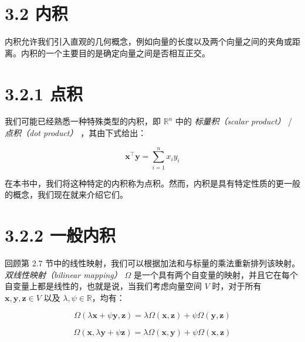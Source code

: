 \section*{3.2 内积}
\label{sec:3.2}

内积允许我们引入直观的几何概念，例如向量的长度以及两个向量之间的夹角或距离。内积的一个主要目的是确定向量之间是否相互正交。

\section*{3.2.1 点积}

我们可能已经熟悉一种特殊类型的内积，即 $ \mathbb{R}^n $ 中的 \emph{标量积（scalar product）} / \emph{点积（dot product）} ，其由下式给出：

\begin{equation}
\boldsymbol{x}^\top \boldsymbol{y} = \sum_{i=1}^n x_i y_i
\tag{3.5}\label{eq:3-5}
\end{equation}

在本书中，我们将这种特定的内积称为点积。然而，内积是具有特定性质的更一般的概念，我们现在就来介绍它们。

\section*{3.2.2 一般内积}

回顾第 2.7 节中的线性映射，我们可以根据加法和与标量的乘法重新排列该映射。 \emph{双线性映射（bilinear mapping）} $ \Omega $ 是一个具有两个自变量的映射，并且它在每个自变量上都是线性的，也就是说，当我们考虑向量空间 $ V $ 时，对于所有 $ \boldsymbol{x}, \boldsymbol{y}, \boldsymbol{z} \in V $ 以及 $ \lambda, \psi \in \mathbb{R} $，均有：

\begin{equation}
\Omega(\lambda \boldsymbol{x} + \psi \boldsymbol{y}, \boldsymbol{z}) = \lambda \Omega(\boldsymbol{x}, \boldsymbol{z}) + \psi \Omega(\boldsymbol{y}, \boldsymbol{z})
\tag{3.6}\label{eq:3-6}
\end{equation}

\begin{equation}
\Omega(\boldsymbol{x}, \lambda \boldsymbol{y} + \psi \boldsymbol{z}) = \lambda \Omega(\boldsymbol{x}, \boldsymbol{y}) + \psi \Omega(\boldsymbol{x}, \boldsymbol{z})
\tag{3.7}\label{eq:3-7}
\end{equation}

